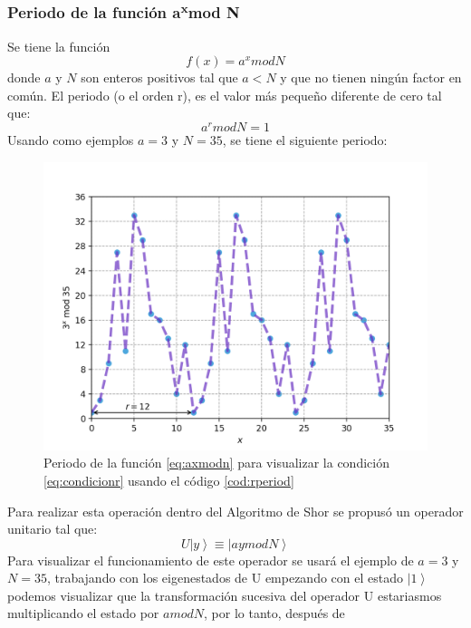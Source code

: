\subsubsection{Periodo de la función a\textsuperscript{x}mod N}
Se tiene la función \begin{equation}
    f(x)=a^x mod N
    \label{eq:axmodn}
\end{equation}
donde $a$ y $N$ son enteros positivos tal que $a<N$ y que no tienen ningún factor en común. El periodo (o el orden r), es el valor más pequeño 
diferente de cero tal que:
\begin{equation}
    a^r mod N =1
    \label{eq:condicionr}
\end{equation}
Usando como ejemplos $a=3$ y $N=35$, se tiene el siguiente periodo:
\begin{figure}[H]
    \centering
    \includegraphics[scale=0.65]{../Graphics/period.png}
    \caption{Periodo de la función \ref{eq:axmodn} para visualizar la condición \ref{eq:condicionr} usando el código \ref{cod:rperiod}}
    \label{fig:condicionr}
\end{figure}
Para realizar esta operación dentro del Algoritmo de Shor se propusó un operador unitario tal que:
\begin{equation}
    U \left| y \right\rangle \equiv \left| ay mod N \right\rangle 
    \label{eq:umod}
\end{equation}
Para visualizar el funcionamiento de este operador se usará el ejemplo de $a=3$ y $N=35$, trabajando con los eigenestados de U empezando con el estado 
$\left|1\right\rangle$ podemos visualizar que la transformación sucesiva del operador U estariasmos multiplicando el estado por $amodN$, por lo tanto, después de
